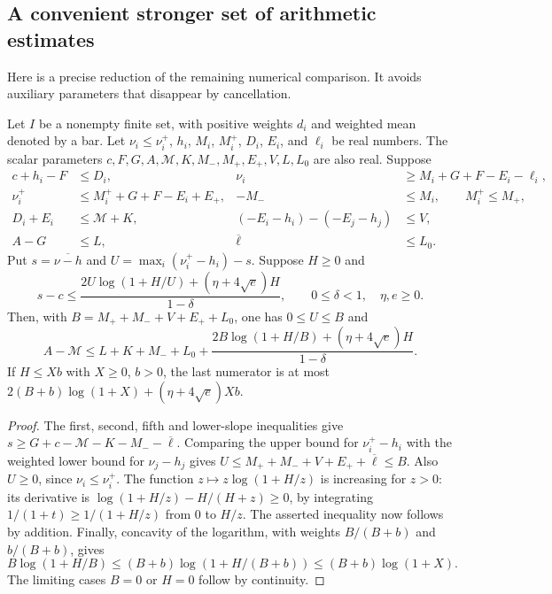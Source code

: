 \subsection{A convenient stronger set of arithmetic estimates}

Here is a precise reduction of the remaining numerical comparison.
It avoids auxiliary parameters that disappear by cancellation.

\begin{lemma}\label{cs-combination}
Let $I$ be a nonempty finite set, with positive weights $d_i$ and
weighted mean denoted by a bar. Let
$\nu_i\le\nu_i^+$, $h_i$, $M_i$, $M_i^+$, $D_i$, $E_i$, and $\ell_i$
be real numbers. The scalar parameters
$c,F,G,A,\mathcal M,K,M_-,M_+,E_+,V,L,L_0$ are also real.
Suppose
\begin{align*}
 c+h_i-F&\le D_i,&
 \nu_i&\ge M_i+G+F-E_i-\ell_i,\\
 \nu_i^+&\le M_i^++G+F-E_i+E_+,&
 -M_-&\le M_i,\qquad M_i^+\le M_+,\\
 D_i+E_i&\le\mathcal M+K,&
 (-E_i-h_i)-(-E_j-h_j)&\le V,\\
 A-G&\le L,&\overline\ell&\le L_0.
\end{align*}
Put $s=\overline{\nu-h}$ and
$U=\max_i(\nu_i^+-h_i)-s$. Suppose $H\ge0$ and
\[
 s-c\le\frac{2U\log(1+H/U)+(\eta+4\sqrt e)H}{1-\delta},
 \qquad 0\le\delta<1,\quad\eta,e\ge0.
\]
Then, with $B=M_++M_-+V+E_++L_0$, one has $0\le U\le B$ and
\[
 A-\mathcal M\le L+K+M_-+L_0+
 \frac{2B\log(1+H/B)+(\eta+4\sqrt e)H}{1-\delta}.
\]
If $H\le Xb$ with $X\ge0$, $b>0$, the last numerator is at most
$2(B+b)\log(1+X)+(\eta+4\sqrt e)Xb$.
\end{lemma}
\begin{proof}
The first, second, fifth and lower-slope inequalities give
$s\ge G+c-\mathcal M-K-M_--\overline\ell$.
Comparing the upper bound for $\nu_i^+-h_i$ with the weighted lower
bound for $\nu_j-h_j$ gives
$U\le M_++M_-+V+E_++\overline\ell\le B$.
Also $U\ge0$, since $\nu_i\le\nu_i^+$.
The function $z\mapsto z\log(1+H/z)$ is increasing for $z>0$:
its derivative is
$\log(1+H/z)-H/(H+z)\ge0$, by integrating
$1/(1+t)\ge1/(1+H/z)$ from $0$ to $H/z$.
The asserted inequality now follows by addition. Finally, concavity of
the logarithm, with weights $B/(B+b)$ and $b/(B+b)$, gives
\[
 B\log(1+H/B)\le(B+b)\log(1+H/(B+b))
 \le(B+b)\log(1+X).
\]
The limiting cases $B=0$ or $H=0$ follow by continuity.
\end{proof}


